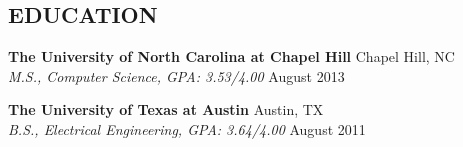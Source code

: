 \documentclass[line,margin,letterpaper]{res}
\begin{document}
\address{+44 7552 077771 - alfredo@miranda.io - https://miranda.io}

\begin{resume}
 
\section{EDUCATION} 
  {\bf The University of North Carolina at Chapel Hill} 
  \hfill Chapel Hill, NC \\
  \emph{M.S., Computer Science, GPA: 3.53/4.00} \hfill August 2013

  {\bf The University of Texas at Austin} \hfill Austin, TX \\
  \emph{B.S., Electrical Engineering, GPA: 3.64/4.00} \hfill  August 2011 %
 

\end{resume}
\end{document}
